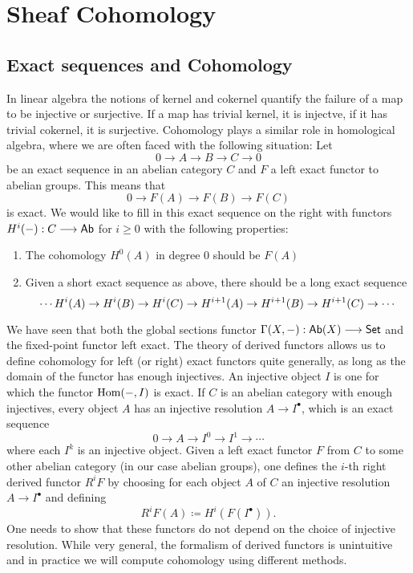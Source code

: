 \section{Sheaf Cohomology}

\subsection{Exact sequences and Cohomology}

In linear algebra the notions of kernel and cokernel quantify the failure of a map to be injective or surjective. If a map has trivial kernel, it is injectve, if it has trivial cokernel, it is surjective. Cohomology plays a similar role in homological algebra, where we are often faced with the following situation:
Let
\[
	0 \to A \to B \to C \to 0
\]
be an exact sequence in an abelian category $C$ and $F$ a left exact functor to abelian groups. This means that
\[
	0 \to F(A) \to F(B) \to F(C)
\]
is exact. We  would like to fill in this exact sequence on the right with functors $H^i(-): C \longrightarrow \mathsf{Ab}$ for $i \ge 0$ with the following properties:
\begin{enumerate}
	\item The cohomology $H^0(A)$ in degree 0 should be $F(A)$
	\item Given a short exact sequence as above, there should be a long exact sequence
	      \[
		      \cdots H^i(A) \shortto H^i(B) \shortto H^i(C) \shortto H^{i+1}(A) \shortto H^{i+1}(B) \shortto H^{i+1}(C) \shortto \cdots
	      \]
\end{enumerate}

We have seen that both the global sections functor $\Gamma(X,-): \mathsf{Ab}(X) \longrightarrow \mathsf{Set}$ and the fixed-point functor left exact. The theory of derived functors allows us to define cohomology for left (or right) exact functors quite generally, as long as the domain of the functor has enough injectives. An injective object $I$ is one for which the functor $\operatorname{Hom}(-,I)$ is exact. If $C$ is an abelian category with enough injectives, every object $A$ has an injective resolution $A \to I^\bullet$, which is an exact sequence
\[
	0 \to A \to I^0 \to I^1 \to \cdots
\]
where each $I^k$ is an injective object. Given a left exact functor $F$ from $C$ to some other abelian category (in our case abelian groups), one defines the $i$-th right derived functor $R^i F$ by choosing for each object $A$ of $C$ an injective resolution $A \to I^\bullet$ and defining
\[
	R^i F(A) \coloneqq H^i(F(I^\bullet)).
\]
One needs to show that these functors do not depend on the choice of injective resolution. While very general, the formalism of derived functors is unintuitive and in practice we will compute cohomology using different methods.

